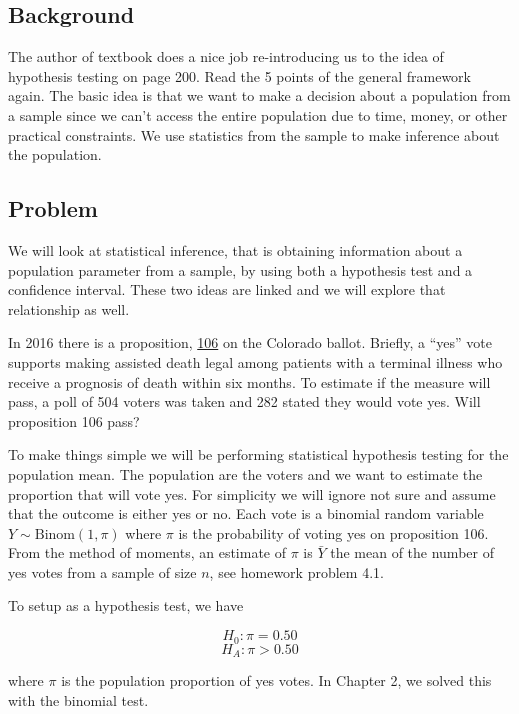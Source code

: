 \documentclass[]{book}
\theoremstyle{definition}
\theoremstyle{definition}
\theoremstyle{definition}
\theoremstyle{remark}
\begin{document}
\subsection{Background}\label{background-4}

The author of textbook does a nice job re-introducing us to the idea of
hypothesis testing on page 200. Read the 5 points of the general
framework again. The basic idea is that we want to make a decision about
a population from a sample since we can't access the entire population
due to time, money, or other practical constraints. We use statistics
from the sample to make inference about the population.

\subsection{Problem}\label{problem-3}

We will look at statistical inference, that is obtaining information
about a population parameter from a sample, by using both a hypothesis
test and a confidence interval. These two ideas are linked and we will
explore that relationship as well.

In 2016 there is a proposition,
\href{https://ballotpedia.org/Colorado_\%22End_of_Life_Options_Act,\%22_Proposition_106_(2016)}{106}
on the Colorado ballot. Briefly, a ``yes'' vote supports making assisted
death legal among patients with a terminal illness who receive a
prognosis of death within six months. To estimate if the measure will
pass, a poll of 504 voters was taken and 282 stated they would vote yes.
Will proposition 106 pass?

To make things simple we will be performing statistical hypothesis
testing for the population mean. The population are the voters and we
want to estimate the proportion that will vote yes. For simplicity we
will ignore not sure and assume that the outcome is either yes or no.
Each vote is a binomial random variable \(Y \sim \mbox{Binom}(1,\pi)\)
where \(\pi\) is the probability of voting yes on proposition 106. From
the method of moments, an estimate of \(\pi\) is \(\bar{Y}\) the mean of
the number of yes votes from a sample of size \(n\), see homework
problem 4.1.

To setup as a hypothesis test, we have

\[H_{0}: \pi = 0.50\] \[H_{A}: \pi > 0.50\]

where \(\pi\) is the population proportion of yes votes. In Chapter 2,
we solved this with the binomial test.
\end{document}
